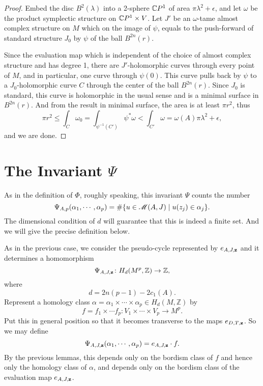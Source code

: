 \documentclass[twoside]{article}
\begin{document}
\begin{proof}
    Embed the disc $B^2(\lambda)$ into a 2-sphere $\mathbb{C}P^{1}$ of area $\pi\lambda^2+\epsilon$, 
    and let $\omega$ be the product symplectic structure on $\mathbb{C}P^{1}\times V$. 
    Let $J'$ be an $\omega$-tame almost complex structure on $M$ which on the image of $\psi$, 
    equals to the push-forward of standard structure $J_0$ by $\psi$ of the ball $B^{2n}(r)$.
    
    Since the evaluation map which is independent of the choice of 
    almost complex structure and has degree 1, 
    there are $J'$-holomorphic curves through every point of $M$, 
    and in particular, one curve through $\psi(0)$. 
    This curve pulls back by $\psi$ to a $J_0$-holomorphic curve $C$ through 
    the center of the ball $B^{2n}(r)$. Since $J_0$ is standard, 
    this curve is holomorphic in the usual sense and is a minimal surface in $B^{2n}(r)$. 
    And from the result in minimal surface, the area is at least $\pi r^2$, thus
    \[\pi r^2\leq\int_C \omega_0=\int_{\psi^{-1}(C')}\psi^*\omega<\int_{C'}\omega=\omega(A)\pi\lambda^2+\epsilon,\]
    and we are done.
\end{proof}

\section{The Invariant \texorpdfstring{$\Psi$}{Ψ}}

As in the definition of $\Phi$, roughly speaking, this invariant $\Psi$ counts the number
\[\Psi_{A,p}(\alpha_1,\cdots,\alpha_p)=\#\{ u\in\mathscr{M}(A,J)\mid u(z_j)\in\alpha_j  \}.\]
The dimensional condition of $d$ will guarantee that this is indeed a finite set. 
And we will give the precise definition below.

As in the previous case, we consider the pseudo-cycle represented by $e_{A,J,\mathbf{z}}$ 
and it determines a homomorphism
\[\Psi_{A,J,\mathbf{z}}\colon H_d(M^p,\mathbb{Z})\rightarrow \mathbb{Z},\]
where
\[d=2n(p-1)-2c_1(A).\]
Represent a homology class $\alpha=\alpha_1\times\cdots\times\alpha_p\in H_d(M,\mathbb{Z})$ by 
\[f=f_1\times\cdots f_p\colon V_1\times\cdots\times V_p\rightarrow M^p.\]
Put this in general position so that it becomes transverse to the maps $e_{D,T,\mathbf{z}}$.
So we may define
\[\Psi_{A,J,\mathbf{z}}(\alpha_1,\cdots,\alpha_p)=e_{A,J,\mathbf{z}}\cdot f.\]
By the previous lemmas, this depends only on the bordism class of $f$ 
and hence only the homology class of $\alpha$, 
and depends only on the bordism class of the evaluation map $e_{A,J,\mathbf{z}}$.
\end{document}
